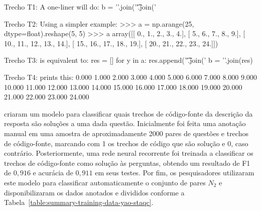 \begin{tcolorbox}[colframe=orange!75!black,colback=gray!15!white,fonttitle=\bfseries,adjusted title=\large{Título da questão: convert 2d numpy array to string}~\ref{foot:exemplo-stackoverflow-mais-de-um-trecho}]
\begin{mypythongreen}{Trecho T1: A one-liner will do:}
b = '\n'.join('\t'.join('%
\end{mypythongreen}

\begin{mypythonred}{Trecho T2: Using a simpler example:}
>>> a = np.arange(25, dtype=float).reshape(5, 5)
>>> a
array([[  0.,   1.,   2.,   3.,   4.],
       [  5.,   6.,   7.,   8.,   9.],
       [ 10.,  11.,  12.,  13.,  14.],
       [ 15.,  16.,  17.,  18.,  19.],
       [ 20.,  21.,  22.,  23.,  24.]])
\end{mypythonred}
\begin{mypythongreen}{Trecho T3: is equivalent to:}
res = []
for y in a:
    res.append('\t'.join('%
b = '\n'.join(res)
\end{mypythongreen}
\begin{mypythonred}{Trecho T4: prints this:}
0.000   1.000   2.000   3.000   4.000
5.000   6.000   7.000   8.000   9.000
10.000  11.000  12.000  13.000  14.000
15.000  16.000  17.000  18.000  19.000
20.000  21.000  22.000  23.000  24.000
\end{mypythonred}
\end{tcolorbox}


\cite{yao-2018} criaram um modelo para classificar quais trechos de código-fonte da descrição da resposta são soluções a uma dada questão. Inicialmente foi feita uma anotação manual em uma amostra de aproximadamente 2000 pares de questões e trechos de código-fonte, marcando com 1 os trechos de código que são solução e 0, caso contrário. Posteriormente, uma rede neural recorrente foi treinada a classificar os trechos de código-fonte como solução às perguntas, obtendo um resultado de F1 de $0,916$ e acurácia de $0,911$ em seus testes. Por fim, os pesquisadores utilizaram este modelo para classificar automaticamente o conjunto de pares $N_{2}$ e disponibilizaram os dados anotados e divididos conforme a Tabela~\ref{table:summary-training-data-yao-staqc}.

